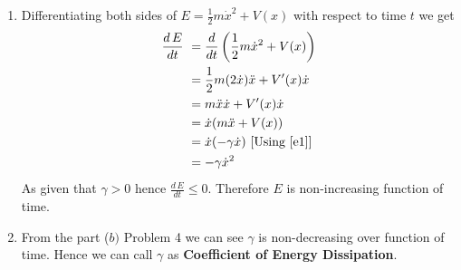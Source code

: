 \documentclass{article}
\begin{document}
\begin{enumerate}
\begin{enumerate}
	\item Differentiating both sides of $E=\frac12m\dot{x}^2+V(x)$ with respect to time $t$ we get\begin{align*}
		 \frac{d\,E}{dt}\ &=\frac{d}{dt}\left( \frac12m\dot{x}^2+V(x)\right)  \\
		& = \frac12m(2\dot{x})\ddot{x}+V'(x)\dot{x}\\
		& = m\ddot{x}\dot{x}+V'(x)\dot{x}\\
		& = \dot{x}(m\ddot{x}+V(x))\\
		& =\dot{x}(-\gamma \dot{x}) \ [\text{Using \eqref{e1}}]\\
		& = -\gamma\dot{x}^2
	\end{align*}
As given that $\gamma>0$ hence $\frac{d\, E}{dt}\leq 0$. Therefore $E$ is non-increasing function of time.
\item From the part ($b)$ Problem 4 we can see $\gamma$ is non-decreasing over function of time. Hence we can call $\gamma$ as \textbf{Coefficient of Energy Dissipation}.
\end{enumerate}
		\end{enumerate}
\end{document}
